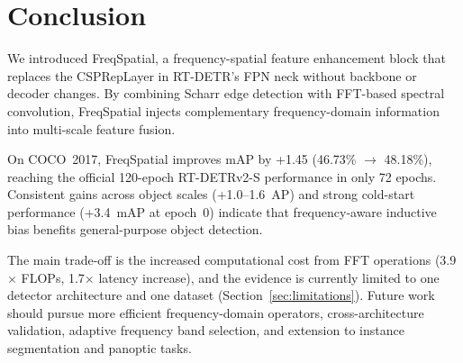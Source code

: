 \documentclass[10pt,twocolumn]{IEEEtran}
\begin{document}
\section{Conclusion}
\label{sec:conclusion}

We introduced FreqSpatial, a frequency-spatial feature enhancement block
that replaces the CSPRepLayer in RT-DETR's FPN neck without backbone or
decoder changes. By combining Scharr edge detection with FFT-based spectral
convolution, FreqSpatial injects complementary frequency-domain information
into multi-scale feature fusion.

On COCO~2017, FreqSpatial improves mAP by +1.45 (46.73\% $\to$ 48.18\%),
reaching the official 120-epoch RT-DETRv2-S performance in only 72 epochs.
Consistent gains across object scales (+1.0--1.6~AP) and strong cold-start
performance (+3.4~mAP at epoch~0) indicate that frequency-aware inductive bias benefits
general-purpose object detection.

The main trade-off is the increased computational cost from FFT operations
(3.9$\times$ FLOPs, 1.7$\times$ latency increase), and the evidence is
currently limited to one detector architecture and one dataset (Section~\ref{sec:limitations}).
Future work should pursue more efficient frequency-domain operators,
cross-architecture validation, adaptive frequency band selection, and extension to
instance segmentation and panoptic tasks.
\end{document}
